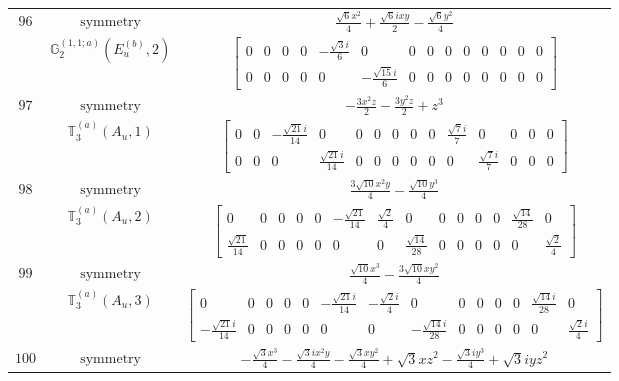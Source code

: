 \documentclass[fleqn,8pt,landscape]{jsarticle}
\begin{document}
\begin{longtable}{ccc}
$ 96 $ & $ \text{symmetry} $ & $ \frac{\sqrt{6} x^{2}}{4} + \frac{\sqrt{6} i x y}{2} - \frac{\sqrt{6} y^{2}}{4} $ \\
$  $ & $ \mathbb{G}_{2}^{(1,1;a)}(E_{u}^{(b)},2) $ & $ \begin{bmatrix} 0 & 0 & 0 & 0 & - \frac{\sqrt{3} i}{6} & 0 & 0 & 0 & 0 & 0 & 0 & 0 & 0 & 0 \\ 0 & 0 & 0 & 0 & 0 & - \frac{\sqrt{15} i}{6} & 0 & 0 & 0 & 0 & 0 & 0 & 0 & 0 \end{bmatrix} $ \\ \hline
$ 97 $ & $ \text{symmetry} $ & $ - \frac{3 x^{2} z}{2} - \frac{3 y^{2} z}{2} + z^{3} $ \\
$  $ & $ \mathbb{T}_{3}^{(a)}(A_{u},1) $ & $ \begin{bmatrix} 0 & 0 & - \frac{\sqrt{21} i}{14} & 0 & 0 & 0 & 0 & 0 & 0 & \frac{\sqrt{7} i}{7} & 0 & 0 & 0 & 0 \\ 0 & 0 & 0 & \frac{\sqrt{21} i}{14} & 0 & 0 & 0 & 0 & 0 & 0 & \frac{\sqrt{7} i}{7} & 0 & 0 & 0 \end{bmatrix} $ \\ \hline
$ 98 $ & $ \text{symmetry} $ & $ \frac{3 \sqrt{10} x^{2} y}{4} - \frac{\sqrt{10} y^{3}}{4} $ \\
$  $ & $ \mathbb{T}_{3}^{(a)}(A_{u},2) $ & $ \begin{bmatrix} 0 & 0 & 0 & 0 & 0 & - \frac{\sqrt{21}}{14} & \frac{\sqrt{2}}{4} & 0 & 0 & 0 & 0 & 0 & \frac{\sqrt{14}}{28} & 0 \\ \frac{\sqrt{21}}{14} & 0 & 0 & 0 & 0 & 0 & 0 & \frac{\sqrt{14}}{28} & 0 & 0 & 0 & 0 & 0 & \frac{\sqrt{2}}{4} \end{bmatrix} $ \\ \hline
$ 99 $ & $ \text{symmetry} $ & $ \frac{\sqrt{10} x^{3}}{4} - \frac{3 \sqrt{10} x y^{2}}{4} $ \\
$  $ & $ \mathbb{T}_{3}^{(a)}(A_{u},3) $ & $ \begin{bmatrix} 0 & 0 & 0 & 0 & 0 & - \frac{\sqrt{21} i}{14} & - \frac{\sqrt{2} i}{4} & 0 & 0 & 0 & 0 & 0 & \frac{\sqrt{14} i}{28} & 0 \\ - \frac{\sqrt{21} i}{14} & 0 & 0 & 0 & 0 & 0 & 0 & - \frac{\sqrt{14} i}{28} & 0 & 0 & 0 & 0 & 0 & \frac{\sqrt{2} i}{4} \end{bmatrix} $ \\ \hline
$ 100 $ & $ \text{symmetry} $ & $ - \frac{\sqrt{3} x^{3}}{4} - \frac{\sqrt{3} i x^{2} y}{4} - \frac{\sqrt{3} x y^{2}}{4} + \sqrt{3} x z^{2} - \frac{\sqrt{3} i y^{3}}{4} + \sqrt{3} i y z^{2} $ \\

\end{longtable}
\end{document}
